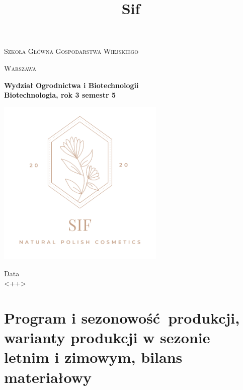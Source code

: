 \documentclass{article}
\title{Sif}
\begin{document}
\begin{titlepage}
	\begin{center}
	{\scshape\huge Szkoła Główna Gospodarstwa Wiejskiego \par}
	\vspace{0.5cm}
	{\scshape\LARGE Warszawa \par}
	\vspace{0.5cm}
	{\LARGE\bfseries Wydział Ogrodnictwa i Biotechnologii \\ Biotechnologia, rok 3 semestr 5 \par}
	{\includegraphics[width=0.6\textwidth]{sif.png}}
	\vfill

\vfill

	{\LARGE Data \\ <++> \par}
	\end{center}
\end{titlepage}

\tableofcontents

\newpage





\nocite{Grote1988, Oh1987, Leite2020, Ziaja, 4Szpaki, Kosmopedia, KosmetykWszechCzasów, SubiektynikKosmetyczny, Loczek}







\section{Program i sezonowość produkcji, warianty produkcji w sezonie letnim i zimowym, bilans materiałowy}
\end{document}

